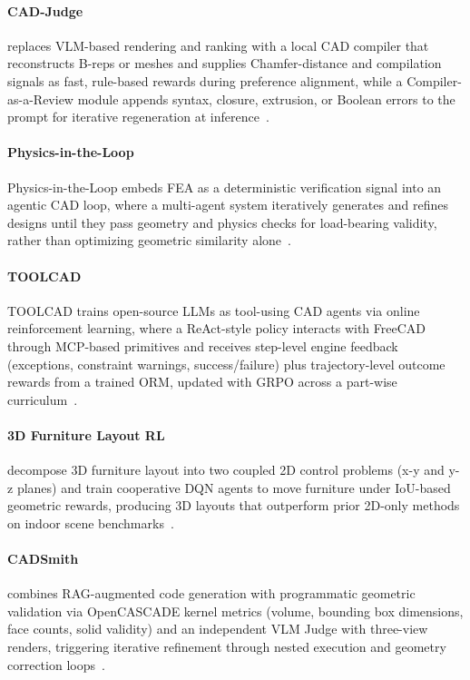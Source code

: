 \paragraph{CAD-Judge}
replaces VLM-based rendering and ranking with a local CAD compiler that reconstructs B-reps or meshes and supplies Chamfer-distance and compilation signals as fast, rule-based rewards during preference alignment, while a Compiler-as-a-Review module appends syntax, closure, extrusion, or Boolean errors to the prompt for iterative regeneration at inference~\cite{zhou2025cadjudge}.  

\paragraph{Physics-in-the-Loop}
Physics-in-the-Loop embeds FEA as a deterministic verification signal into an agentic CAD loop, where a multi-agent system iteratively generates and refines designs until they pass geometry and physics checks for load-bearing validity, rather than optimizing geometric similarity alone~\cite{avg260519717}. 



\paragraph{TOOLCAD}
TOOLCAD trains open-source LLMs as tool-using CAD agents via online reinforcement learning, where a ReAct-style policy interacts with FreeCAD through MCP-based primitives and receives step-level engine feedback (exceptions, constraint warnings, success/failure) plus trajectory-level outcome rewards from a trained ORM, updated with GRPO across a part-wise curriculum~\cite{gong2026toolcad}. 


\paragraph{3D Furniture Layout RL}
decompose 3D furniture layout into two coupled 2D control problems (x-y and y-z planes) and train cooperative DQN agents to move furniture under IoU-based geometric rewards, producing 3D layouts that outperform prior 2D-only methods on indoor scene benchmarks~\cite{avg210209137}.

\paragraph{CADSmith} combines RAG-augmented code generation with programmatic geometric validation via OpenCASCADE kernel metrics (volume, bounding box dimensions, face counts, solid validity) and an independent VLM Judge with three-view renders, triggering iterative refinement through nested execution and geometry correction loops~\cite{barkley2026cadsmith}.

